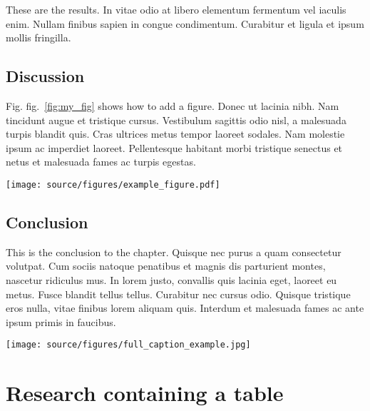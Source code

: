 \documentclass[12pt,a4paper,]{report}
\let\origfigure=\figure
\let\endorigfigure=\endfigure
\renewenvironment{figure}[1][]{%
\origfigure[b]
}{%
\endorigfigure
}
\begin{document}
These are the results. In vitae odio at libero elementum fermentum vel
iaculis enim. Nullam finibus sapien in congue condimentum. Curabitur et
ligula et ipsum mollis fringilla.

\hypertarget{discussion-1}{%
\section{Discussion}\label{discussion-1}}

Fig. fig.~\ref{fig:my_fig} shows how to add a figure. Donec ut lacinia
nibh. Nam tincidunt augue et tristique cursus. Vestibulum sagittis odio
nisl, a malesuada turpis blandit quis. Cras ultrices metus tempor
laoreet sodales. Nam molestie ipsum ac imperdiet laoreet. Pellentesque
habitant morbi tristique senectus et netus et malesuada fames ac turpis
egestas.

\begin{figure}
\hypertarget{fig:my_fig}{%
\centering
\texttt{[image: source/figures/example\_figure.pdf]}
\caption{RV Calypso is a former British Royal Navy minesweeper converted
into a research vessel for the oceanographic researcher Jacques-Yves
Cousteau. It was equipped with a mobile laboratory for underwater field
research.}\label{fig:my_fig}
}
\end{figure}

\hypertarget{conclusion-2}{%
\section{Conclusion}\label{conclusion-2}}

This is the conclusion to the chapter. Quisque nec purus a quam
consectetur volutpat. Cum sociis natoque penatibus et magnis dis
parturient montes, nascetur ridiculus mus. In lorem justo, convallis
quis lacinia eget, laoreet eu metus. Fusce blandit tellus tellus.
Curabitur nec cursus odio. Quisque tristique eros nulla, vitae finibus
lorem aliquam quis. Interdum et malesuada fames ac ante ipsum primis in
faucibus.

\begin{figure}
\hypertarget{fig:other_fig}{%
\centering
\texttt{[image: source/figures/full\_caption\_example.jpg]}
\caption{This is not a boat}\label{fig:other_fig}
}
\end{figure}

\hypertarget{research-containing-a-table}{%
\chapter{Research containing a
table}\label{research-containing-a-table}}
\end{document}
